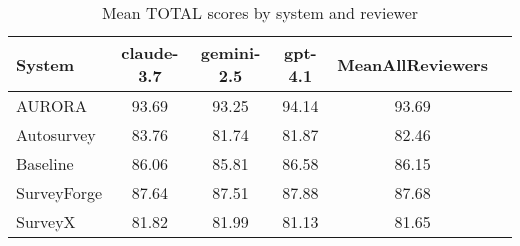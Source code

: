 \begin{table}
\caption{Mean TOTAL scores by system and reviewer}
\label{tab:mean_total_scores}
\begin{tabular}{lccccc}
\toprule
System & claude-3.7 & gemini-2.5 & gpt-4.1 & MeanAllReviewers \\
\midrule
AURORA & 93.69 & 93.25 & 94.14 & 93.69 \\
Autosurvey & 83.76 & 81.74 & 81.87 & 82.46 \\
Baseline & 86.06 & 85.81 & 86.58 & 86.15 \\
SurveyForge & 87.64 & 87.51 & 87.88 & 87.68 \\
SurveyX & 81.82 & 81.99 & 81.13 & 81.65 \\
\bottomrule
\end{tabular}
\end{table}
